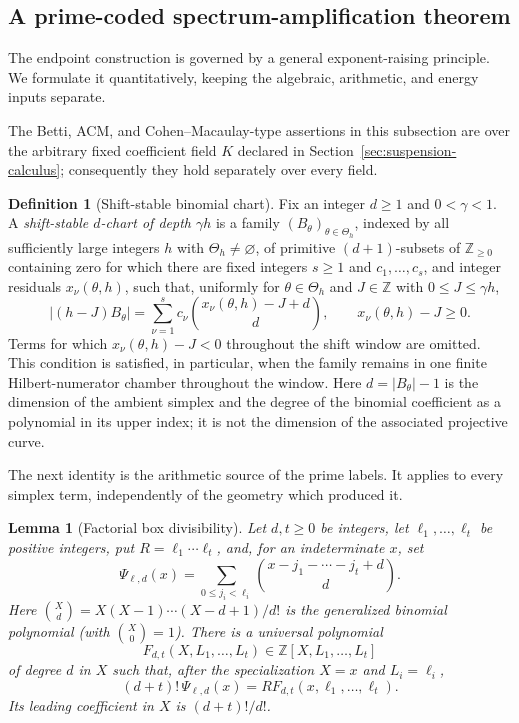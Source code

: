 \documentclass[11pt,reqno]{amsart}
\newtheorem{lemma}[theorem]{Lemma}
\theoremstyle{definition}
\newtheorem{definition}[theorem]{Definition}
\theoremstyle{remark}
\begin{document}
\subsection{A prime-coded spectrum-amplification theorem}
\label{sec:prime-suspension-amplification}

The endpoint construction is governed by a general exponent-raising
principle.  We formulate it quantitatively, keeping the algebraic,
arithmetic, and energy inputs separate.

The Betti, ACM, and Cohen--Macaulay-type assertions in this subsection are
over the arbitrary fixed coefficient field $K$ declared in
Section~\ref{sec:suspension-calculus}; consequently they hold separately over
every field.

\begin{definition}[Shift-stable binomial chart]
\label{def:shift-stable-chart}
Fix an integer $d\geq1$ and $0<\gamma<1$.  A \emph{shift-stable $d$-chart
of depth $\gamma h$} is a family
$(B_\theta)_{\theta\in\Theta_h}$, indexed by all sufficiently large integers
$h$ with $\Theta_h\ne\varnothing$, of primitive
$(d+1)$-subsets of $\mathbb Z_{\geq0}$ containing zero for which there are
fixed integers $s\geq1$ and $c_1,\ldots,c_s$, and integer residuals
$x_\nu(\theta,h)$, such that, uniformly for $\theta\in\Theta_h$ and
$J\in\mathbb Z$ with $0\leq J\leq\gamma h$,
\begin{equation}\label{eq:stable-chart-general}
 |(h-J)B_\theta|
 =\sum_{\nu=1}^{s}c_\nu
  \binom{x_\nu(\theta,h)-J+d}{d},
 \qquad x_\nu(\theta,h)-J\geq0.
\end{equation}
Terms for which $x_\nu(\theta,h)-J<0$ throughout the shift window are
omitted.  This condition is satisfied, in particular, when the family
remains in one finite Hilbert-numerator chamber throughout the window.
Here $d=|B_\theta|-1$ is the dimension of the ambient simplex and the degree
of the binomial coefficient as a polynomial in its upper index; it is not
the dimension of the associated projective curve.
\end{definition}

The next identity is the arithmetic source of the prime labels.  It applies
to every simplex term, independently of the geometry which produced it.

\begin{lemma}[Factorial box divisibility]
\label{lem:factorial-box-divisibility}
Let $d,t\geq0$ be integers, let $\ell_1,\ldots,\ell_t$ be positive
integers, put $R=\ell_1\cdots\ell_t$, and, for an indeterminate $x$, set
\[
 \Psi_{\boldsymbol\ell,d}(x)
 =\sum_{0\leq j_i<\ell_i}
   \binom{x-j_1-\cdots-j_t+d}{d}.
\]
Here $\binom{X}{d}=X(X-1)\cdots(X-d+1)/d!$ is the generalized binomial
polynomial (with $\binom{X}{0}=1$).
There is a universal polynomial
\[
 F_{d,t}(X,L_1,\ldots,L_t)
 \in\mathbb Z[X,L_1,\ldots,L_t]
\]
of degree $d$ in $X$ such that, after the specialization
$X=x$ and $L_i=\ell_i$,
\begin{equation}\label{eq:factorial-box-divisibility}
 (d+t)!\,\Psi_{\boldsymbol\ell,d}(x)
 =R F_{d,t}(x,\ell_1,\ldots,\ell_t).
\end{equation}
Its leading coefficient in $X$ is $(d+t)!/d!$.
\end{lemma}
\end{document}
